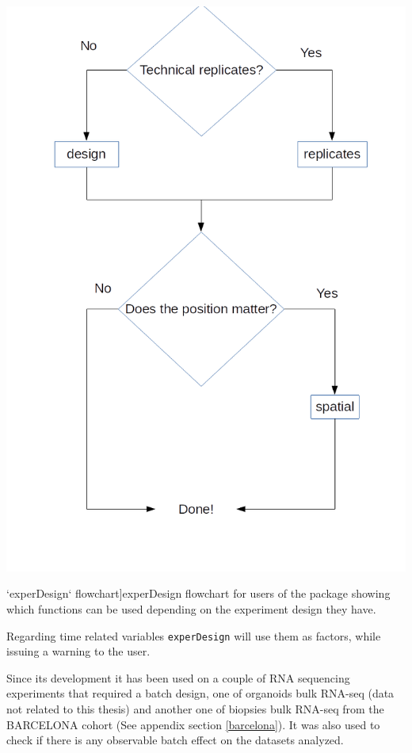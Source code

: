 \documentclass[
  12pt,
  a4paper,
  twoside,
  openright]{book}
\let\origfigure\figure
\let\endorigfigure\endfigure
\renewenvironment{figure}[1][2] {
    \expandafter\origfigure\expandafter[!ht]
} {
    \endorigfigure
}
\begin{document}
\begin{figure}
\includegraphics[width=1\linewidth]{images/experDesign-flowchart} \caption[`experDesign` flowchart]{experDesign flowchart for users of the package showing which functions can be used depending on the experiment design they have.}\label{fig:experdesign-flowchart}
\end{figure}

Regarding time related variables \texttt{experDesign} will use them as factors, while issuing a warning to the user.

Since its development it has been used on a couple of RNA sequencing experiments that required a batch design, one of organoids bulk RNA-seq (data not related to this thesis) and another one of biopsies bulk RNA-seq from the BARCELONA cohort (See appendix section \ref{barcelona}).
It was also used to check if there is any observable batch effect on the datasets analyzed.
\end{document}
